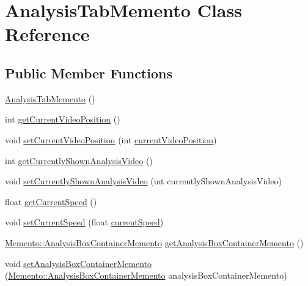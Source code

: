 \hypertarget{classMemento_1_1AnalysisTabMemento}{}\section{Analysis\+Tab\+Memento Class Reference}
\label{classMemento_1_1AnalysisTabMemento}
\subsection*{Public Member Functions}
\begin{DoxyCompactItemize}
\item 
\hyperlink{classMemento_1_1AnalysisTabMemento_a035f84d6066cdb7d8a475da4710d2e67}{Analysis\+Tab\+Memento} ()
\item 
int \hyperlink{classMemento_1_1AnalysisTabMemento_af7babc742dcea9250c73c408b2cfacf2}{get\+Current\+Video\+Position} ()
\item 
void \hyperlink{classMemento_1_1AnalysisTabMemento_a66ff926aa567b15381b5906cd65c6b7d}{set\+Current\+Video\+Position} (int \hyperlink{classMemento_1_1AnalysisTabMemento_a137de7f67d8e439c0d22f447c155440f}{current\+Video\+Position})
\item 
int \hyperlink{classMemento_1_1AnalysisTabMemento_a687a0fc92408cf713058eaf23abc22f3}{get\+Currently\+Shown\+Analysis\+Video} ()
\item 
void \hyperlink{classMemento_1_1AnalysisTabMemento_a1d76537f6e47c09e47bf15eefd26feff}{set\+Currently\+Shown\+Analysis\+Video} (int currently\+Shown\+Analysis\+Video)
\item 
float \hyperlink{classMemento_1_1AnalysisTabMemento_a4c7df241ee5989199664bfc3b336d228}{get\+Current\+Speed} ()
\item 
void \hyperlink{classMemento_1_1AnalysisTabMemento_aa99f3e18fe8363d1333c1ddedfa12084}{set\+Current\+Speed} (float \hyperlink{classMemento_1_1AnalysisTabMemento_ab0e55be798261c76019f0c0a8360a99a}{current\+Speed})
\item 
\hyperlink{classMemento_1_1AnalysisBoxContainerMemento}{Memento\+::\+Analysis\+Box\+Container\+Memento} \hyperlink{classMemento_1_1AnalysisTabMemento_a1882d53a845bc483ee4974f633026043}{get\+Analysis\+Box\+Container\+Memento} ()
\item 
void \hyperlink{classMemento_1_1AnalysisTabMemento_aca56db151b2ff66e743215ac8bc5b942}{set\+Analysis\+Box\+Container\+Memento} (\hyperlink{classMemento_1_1AnalysisBoxContainerMemento}{Memento\+::\+Analysis\+Box\+Container\+Memento} analysis\+Box\+Container\+Memento)
\end{DoxyCompactItemize}
